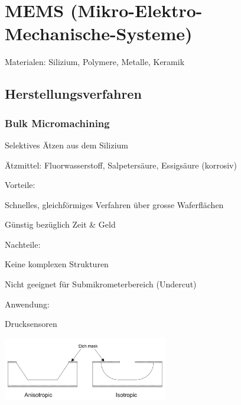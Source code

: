 \section {MEMS (Mikro-Elektro-Mechanische-Systeme)}
\begin{compactitem}
    \item Materialen: Silizium, Polymere, Metalle, Keramik
\end{compactitem}


\subsection{Herstellungsverfahren}
\subsubsection{Bulk Micromachining}
\begin{multicols}{2}
    \begin{compactitem}
      \item Selektives Ätzen aus dem Silizium
      \item Ätzmittel: Fluorwasserstoff, Salpetersäure, Essigsäure (korrosiv)
      \item Vorteile:
      \begin{compactitem}
          \item Schnelles, gleichförmiges Verfahren über grosse Waferflächen
          \item Günstig bezüglich Zeit \& Geld
      \end{compactitem}
      \item Nachteile:
      \begin{compactitem}
          \item Keine komplexen Strukturen
          \item Nicht geeignet für Submikrometerbereich (Undercut)
      \end{compactitem}
      \item Anwendung:
      \begin{compactitem}
          \item Drucksensoren
      \end{compactitem}
    \end{compactitem}

    \includegraphics[width=0.54\textwidth]{images/Bulk_Micro}
\end{multicols}



